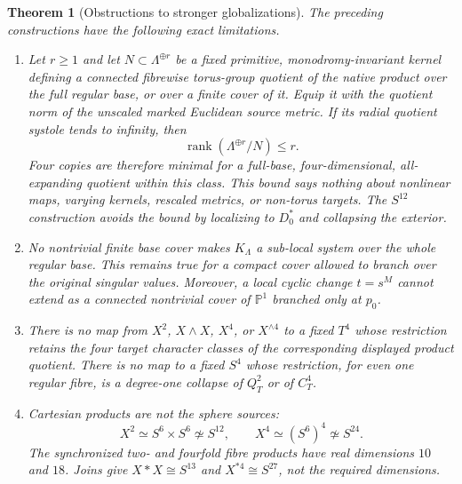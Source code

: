 \documentclass[11pt,letterpaper]{article}
\numberwithin{equation}{section}
\newtheorem{theorem}{Theorem}[section]
\theoremstyle{definition}
\theoremstyle{remark}
\newcommand{\rank}{\operatorname{rank}}
\begin{document}
\begin{theorem}[Obstructions to stronger globalizations]
\label{thm:obstructions}
The preceding constructions have the following exact limitations.
\begin{enumerate}[label=\textup{(\roman*)}]
\item Let $r\ge1$ and let $N\subset\Lambda^{\oplus r}$ be a fixed
primitive, monodromy-invariant kernel defining a connected fibrewise
torus-group quotient of the native product over the full regular base, or
over a finite cover of it.  Equip it with the quotient norm of the
unscaled marked Euclidean source metric.  If its radial quotient systole
tends to infinity, then
\begin{equation}
 \rank(\Lambda^{\oplus r}/N)\le r.
 \label{eq:rank-bound}
\end{equation}
Four copies are therefore minimal for a full-base, four-dimensional,
all-expanding quotient within this class.  This bound says nothing about
nonlinear maps, varying kernels, rescaled metrics, or non-torus targets.
The $S^{12}$ construction avoids the bound by localizing to $D_0^*$ and
collapsing the exterior.

\item No nontrivial finite base cover makes $K_\Lambda$ a sub-local system
over the whole regular base.  This remains true for a compact cover allowed
to branch over the original singular values.  Moreover, a local cyclic
change $t=s^M$ cannot extend as a connected nontrivial cover of
$\mathbb P^1$ branched only at $p_0$.

\item There is no map from $X^2$, $X\wedge X$, $X^4$, or
$X^{\wedge4}$ to a fixed $T^4$ whose restriction retains the four target
character classes of the corresponding displayed product quotient.  There
is no map to a fixed $S^4$ whose restriction, for even one regular fibre,
is a degree-one collapse of $Q_T^2$ or of $C_T^4$.

\item Cartesian products are not the sphere sources:
\begin{equation}
 X^2\simeq S^6\times S^6\not\simeq S^{12},
 \qquad X^4\simeq(S^6)^4\not\simeq S^{24}.
 \label{eq:products-not-spheres}
\end{equation}
The synchronized two- and fourfold fibre products have real dimensions
$10$ and $18$.  Joins give $X*X\cong S^{13}$ and
$X^{*4}\cong S^{27}$, not the required dimensions.


\end{enumerate}
\end{theorem}
\end{document}
